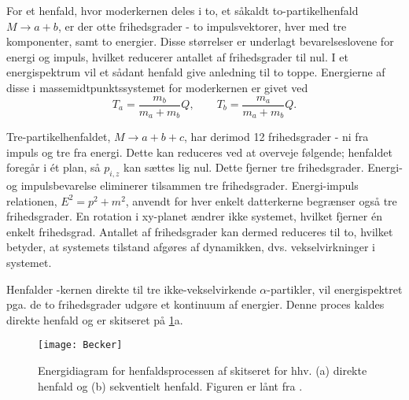 For et henfald, hvor moderkernen deles i to, et såkaldt to-partikelhenfald {$M \rightarrow a + b$},
er der otte frihedsgrader - to impulsvektorer, hver med tre komponenter, samt to energier. Disse
størrelser er underlagt bevarelseslovene for energi og impuls, hvilket reducerer antallet af
frihedsgrader til nul. I et energispektrum vil et sådant henfald give anledning til to
toppe. Energierne af disse i massemidtpunktssystemet for moderkernen er givet ved
\begin{equation}
  \label{eq:toE}
  T_{a} = \frac{m_{b}}{m_{a} + m_{b}}Q, \qquad T_{b} = \frac{m_{a}}{m_{a} + m_{b}}Q.
\end{equation}

Tre-partikelhenfaldet, {$M \rightarrow a + b + c$}, har derimod 12 frihedsgrader - ni fra impuls og
tre fra energi. Dette kan reduceres ved at overveje følgende; henfaldet foregår i ét plan, så
$p_{i,z}$ kan sættes lig nul. Dette fjerner tre frihedsgrader. Energi- og impulsbevarelse eliminerer
tilsammen tre frihedsgrader. Energi-impuls relationen, $E^{2} = p^{2} + m^{2}$, anvendt for hver
enkelt datterkerne begrænser også tre frihedsgrader. En rotation i xy-planet ændrer ikke systemet,
hvilket fjerner én enkelt frihedsgrad. Antallet af frihedsgrader kan dermed reduceres til to,
hvilket betyder, at systemets tilstand afgøres af dynamikken, dvs. vekselvirkninger i systemet.

Henfalder \Carb-kernen direkte til tre ikke-vekselvirkende $\alpha$-partikler, vil energispektret
pga. de to frihedsgrader udgøre et kontinuum af energier. Denne proces kaldes direkte henfald og
er skitseret på \cref{fig:becker}a.

\begin{figure}
  \centering
  \texttt{[image: Becker]}
  \caption{Energidiagram for henfaldsprocessen af \Carb skitseret for hhv. (a) direkte henfald  og
    (b) sekventielt henfald. Figuren er lånt fra \cite{becker}.}
  \label{fig:becker}
  \vspace{-5mm}
\end{figure}
